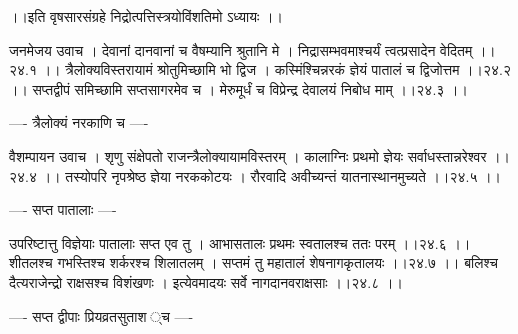 \documentclass[11pt]{book}
\begin{document}
\begin{landscape}
 ।।इति वृषसारसंग्रहे निद्रोत्पत्तिस्त्रयोविंशतिमो ऽध्यायः ।।




जनमेजय उवाच ।
देवानां दानवानां च वैषम्यानि श्रुतानि मे ।
निद्रासम्भवमाश्चर्यं त्वत्प्रसादेन वेदितम् ।।२४.१ ।।
त्रैलोक्यविस्तरायामं श्रोतुमिच्छामि भो द्विज ।
कस्मिंश्चिन्नरकं ज्ञेयं पातालं च द्विजोत्तम ।।२४.२ ।।
सप्तद्वीपं समिच्छामि सप्तसागरमेव च ।
मेरुमूर्धं च विप्रेन्द्र देवालयं निबोध माम् ।।२४.३ ।।

---- त्रैलोक्यं नरकाणि च ----

वैशम्पायन उवाच ।
शृणु संक्षेपतो राजन्त्रैलोक्यायामविस्तरम् ।
कालाग्निः प्रथमो ज्ञेयः सर्वाधस्तान्नरेश्वर ।।२४.४ ।।
तस्योपरि नृपश्रेष्ठ ज्ञेया नरककोटयः ।
रौरवादि अवीच्यन्तं यातनास्थानमुच्यते ।।२४.५ ।।

---- सप्त पातालाः ----

उपरिष्टात्तु विज्ञेयाः पातालाः सप्त एव तु ।
आभासतालः प्रथमः स्वतालश्च ततः परम् ।।२४.६ ।।
शीतलश्च गभस्तिश्च शर्करश्च शिलातलम् ।
सप्तमं तु महातालं शेषनागकृतालयः ।।२४.७ ।।
बलिश्च दैत्यराजेन्द्रो राक्षसश्च विशंखणः ।
इत्येवमादयः सर्वे नागदानवराक्षसाः ।।२४.८ ।।

---- सप्त द्वीपाः प्रियव्रतसुताश{ }्च ----


\end{landscape}
\end{document}
